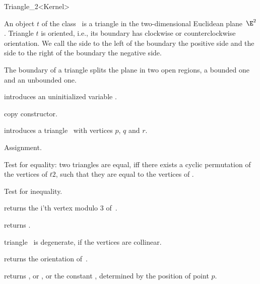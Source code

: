\begin{ccRefClass} {Triangle_2<Kernel>}

\ccDefinition  An object $t$ of the class \ccRefName\ is a triangle 
in the two-dimensional Euclidean plane~$\E^2$. 
Triangle  $t$  is oriented, i.e., its boundary has
clockwise or counterclockwise orientation. We call the side to the left
of the boundary the positive side and the side to the right of the
boundary the negative side.

The boundary of a triangle splits the plane in
two open regions, a bounded one and an unbounded one. 

\ccCreation
{}


\ccHidden {}
             {introduces an uninitialized variable \ccVar.}

\ccHidden {}
 	    {copy constructor.}


            {introduces a triangle \ccVar\ with vertices $p$,  $q$ and $r$.}


\ccOperations

\ccHidden {}
        {Assignment.}

       {Test for equality: two triangles are equal, iff there exists a 
        cyclic permutation of the vertices of $t2$, such that they are 
        equal to the vertices of \ccVar.}

       {Test for inequality.}

       {returns the i'th vertex modulo 3  of~\ccVar.}

       {returns .}

\ccPredicates

       {triangle \ccVar\ is degenerate, if the vertices are collinear.}

       {returns the orientation of~\ccVar.}

       {returns 
        , or
        , 
        or the constant
        ,
        determined by the position of point $p$.
        }


\end{ccRefClass}
